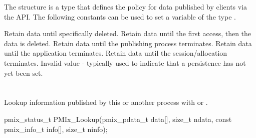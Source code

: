 The  structure is a  type that defines the policy for data published by clients via the  \ac{API}.
The following constants can be used to set a variable of the type .

\begin{constantdesc}
%
Retain data until specifically deleted.
%
Retain data until the first access, then the data is deleted.
%
Retain data until the publishing process terminates.
%
Retain data until the application terminates.
%
Retain data until the session/allocation terminates.
%
Invalid value - typically used to indicate that a persistence has not yet been set.
%
\end{constantdesc}


\section{}

\summary

Lookup information published by this or another process with  or .

\format

\cspecificstart
\begin{codepar}
pmix_status_t
PMIx_Lookup(pmix_pdata_t data[], size_t ndata,
            const pmix_info_t info[], size_t ninfo);
\end{codepar}
\cspecificend

\begin{arglist}
\end{arglist}

